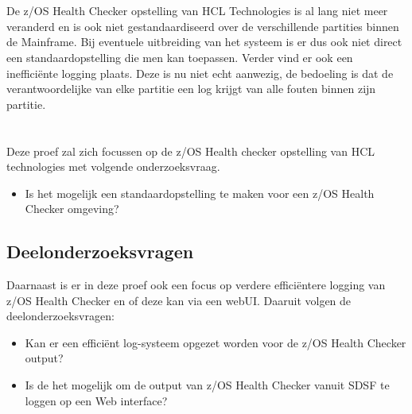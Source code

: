 \section{}
\label{sec:probleemstelling}

De z/OS Health Checker opstelling van HCL Technologies is al lang niet meer veranderd en is ook niet gestandaardiseerd over de verschillende partities binnen de Mainframe. Bij eventuele uitbreiding van het systeem is er dus ook niet direct een standaardopstelling die men kan toepassen. Verder vind er ook een inefficiënte logging plaats. Deze is nu niet echt aanwezig, de bedoeling is dat de verantwoordelijke van elke partitie een log krijgt van alle fouten binnen zijn partitie.

\section{}
\label{sec:Hoofdonderzoeksvraag}

Deze proef zal zich focussen op de z/OS Health checker opstelling van HCL technologies met volgende onderzoeksvraag.

\begin{itemize}
	\item Is het mogelijk een standaardopstelling te maken voor een z/OS Health Checker omgeving?
\end{itemize}

\subsection{Deelonderzoeksvragen}
\label{subsec:Deelonderzoeksvragen}

Daarnaast is er in deze proef ook een focus op verdere efficiëntere logging van z/OS Health Checker en of deze kan via een webUI. Daaruit volgen de deelonderzoeksvragen:

\begin{itemize}
	\item Kan er een efficiënt log-systeem opgezet worden voor de z/OS Health Checker output?
	\item Is de het mogelijk om de output van z/OS Health Checker vanuit SDSF te loggen op een Web interface?
\end{itemize}


\section{}
\label{sec:onderzoeksdoelstelling}

